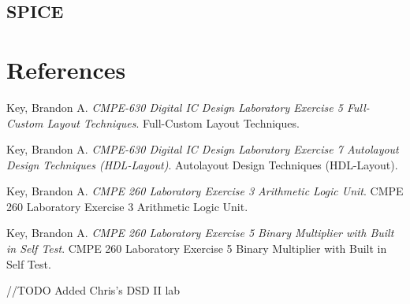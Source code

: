 \documentclass[11pt]{article}
\begin{document}
		
		
	\subsection{SPICE}
	
		
		
		
		
		

		
\section{References}

	Key, Brandon A. \textit{CMPE-630 Digital IC Design Laboratory Exercise 5 Full-Custom Layout Techniques}. Full-Custom Layout Techniques.
	
	Key, Brandon A. \textit{CMPE-630 Digital IC Design Laboratory Exercise 7 Autolayout Design Techniques (HDL-Layout)}. Autolayout Design Techniques (HDL-Layout).
	
	Key, Brandon A. \textit{CMPE 260 Laboratory Exercise 3 Arithmetic Logic Unit}. CMPE 260 Laboratory Exercise 3 Arithmetic Logic Unit.
	
	Key, Brandon A. \textit{CMPE 260 Laboratory Exercise 5 Binary Multiplier with Built in Self Test}. CMPE 260 Laboratory Exercise 5 Binary Multiplier with Built in Self Test.
	
	//TODO Added Chris's DSD II lab
\end{document}
